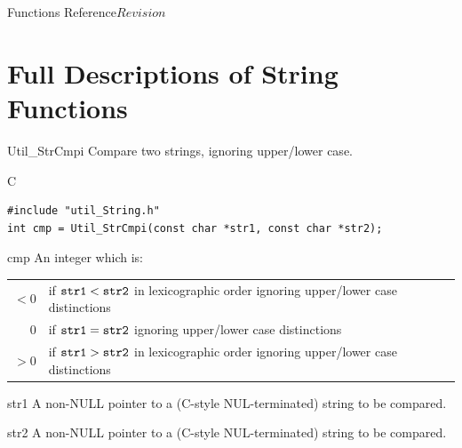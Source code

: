 \begin{cactuspart}{ Functions Reference}{}{$Revision$}

\chapter{Full Descriptions of String Functions}


\begin{FunctionDescription}{Util\_StrCmpi}
\label{Util-StrCmpi}
Compare two strings, ignoring upper/lower case.

\begin{SynopsisSection}
\begin{Synopsis}{C}
\begin{verbatim}
#include "util_String.h"
int cmp = Util_StrCmpi(const char *str1, const char *str2);
\end{verbatim}
\end{Synopsis}
\end{SynopsisSection}

\begin{ResultSection}
\begin{Result}{cmp}
An integer which is:\\
\begin{tabular}{@{}rl}
$<0$	& if $\mbox{\texttt{str1}} < \mbox{\texttt{str2}}$ in lexicographic order
	  ignoring upper/lower case distinctions			\\
$0$	& if $\mbox{\texttt{str1}} = \mbox{\texttt{str2}}$
	  ignoring upper/lower case distinctions			\\
$>0$	& if $\mbox{\texttt{str1}} > \mbox{\texttt{str2}}$ in lexicographic order
	  ignoring upper/lower case distinctions			%
\end{tabular}
\end{Result}
\end{ResultSection}

\begin{ParameterSection}
\begin{Parameter}{str1}
A non-NULL pointer to a (C-style NUL-terminated) string to be compared.
\end{Parameter}
\begin{Parameter}{str2}
A non-NULL pointer to a (C-style NUL-terminated) string to be compared.
\end{Parameter}
\end{ParameterSection}


\end{FunctionDescription}
\end{cactuspart}
